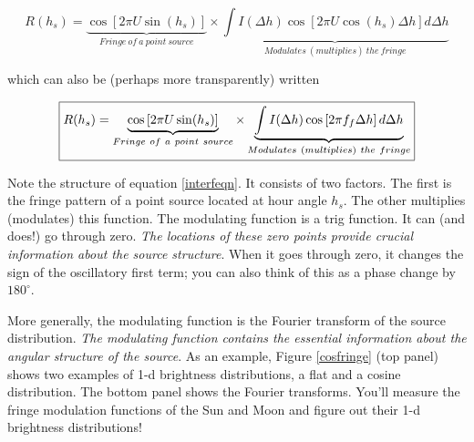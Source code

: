 \documentclass[11pt,preprint]{aastex}
\begin{document}
\begin{mathletters} \label{interfeqn}
\begin{equation} 
R(h_s) = \underbrace{\cos \left[ 2 \pi U 
\sin(h_s) \right]}_{Fringe \ of \ a \ point \ source}
  \times \underbrace{\int I(\Delta h) \cos \left[ 2 \pi U
\cos(h_s) \Delta h \right] d\Delta h}_{Modulates \ (multiplies) \ the \ fringe}
\end{equation}

\noindent which can also be (perhaps more transparently) written

\begin{equation} \fbox{$
R(h_s) = \underbrace{\cos \left[ 2 \pi U 
\sin(h_s) \right]}_{Fringe \ of \ a \ point \ source}
  \times \underbrace{\int I(\Delta h) \cos \left[ 2 \pi 
f_f \Delta h \right] d\Delta h}_{Modulates \ (multiplies) \ the \ fringe}
$}
\end{equation}
\end{mathletters}


	Note the structure of equation \ref{interfeqn}. It consists of
two factors. The first is the fringe pattern of a point source located
at hour angle $h_s$. The other multiplies (modulates) this function. The
modulating function is a trig function. It can (and does!) go through
zero. {\it The locations of these zero points provide crucial
information about the source structure}. When it goes through zero, it
changes the sign of the oscillatory first term; you can also think of
this as a phase change by $180^\circ$. 

	More generally, the modulating function is the Fourier transform
of the source distribution. {\it The modulating function contains the
essential information about the angular structure of the source}. As an
example, Figure \ref{cosfringe} (top panel) shows two examples of
1-d brightness distributions, a flat and a cosine distribution. 
The bottom panel shows the Fourier transforms. You'll measure the fringe
modulation functions of the Sun and Moon and figure out their 1-d
brightness distributions!
\end{document}
